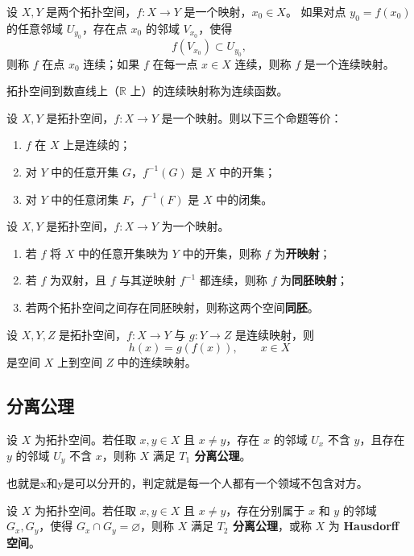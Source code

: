 \begin{definition}[连续映射]
设 $X, Y$ 是两个拓扑空间，$f : X \to Y$ 是一个映射，$x_0 \in X$。  
如果对点 $y_0 = f(x_0)$ 的任意邻域 $U_{y_0}$，存在点 $x_0$ 的邻域 $V_{x_0}$，使得
\[
f(V_{x_0}) \subset U_{y_0},
\]
则称 $f$ 在点 $x_0$ 连续；如果 $f$ 在每一点 $x \in X$ 连续，则称 $f$ 是一个连续映射。  

拓扑空间到数直线上（$\mathbb{R}$ 上）的连续映射称为连续函数。
\end{definition}
\begin{theorem}[连续映射的等价条件]
设 $X, Y$ 是拓扑空间，$f: X \to Y$ 是一个映射。则以下三个命题等价：
\begin{enumerate}
  \item $f$ 在 $X$ 上是连续的；
  \item 对 $Y$ 中的任意开集 $G$，$f^{-1}(G)$ 是 $X$ 中的开集；
  \item 对 $Y$ 中的任意闭集 $F$，$f^{-1}(F)$ 是 $X$ 中的闭集。
\end{enumerate}
\end{theorem}
\begin{proposition}[开映射与同胚]
设 $X, Y$ 是拓扑空间，$f: X \to Y$ 为一个映射。

\begin{enumerate}
  \item 若 $f$ 将 $X$ 中的任意开集映为 $Y$ 中的开集，则称 $f$ 为\textbf{开映射}；
  \item 若 $f$ 为双射，且 $f$ 与其逆映射 $f^{-1}$ 都连续，则称 $f$ 为\textbf{同胚映射}；
  \item 若两个拓扑空间之间存在同胚映射，则称这两个空间\textbf{同胚}。
\end{enumerate}
\end{proposition}


\begin{theorem}[定理 1.5.5]
设 $X,Y,Z$ 是拓扑空间，$f:X \to Y$ 与 $g:Y \to Z$ 是连续映射，则
\[
h(x) = g(f(x)), \qquad x \in X
\]
是空间 $X$ 上到空间 $Z$ 中的连续映射。
\end{theorem}
\subsection{分离公理}
\begin{definition}[$T_1$ 分离公理]
设 $X$ 为拓扑空间。若任取 $x,y\in X$ 且 $x\neq y$，存在 $x$ 的邻域 $U_x$ 不含 $y$，且存在 $y$ 的邻域 $U_y$ 不含 $x$，则称 $X$ 满足 \textbf{$T_1$ 分离公理}。
\end{definition}
也就是x和y是可以分开的，判定就是每一个人都有一个领域不包含对方。
\begin{definition}
设 $X$ 为拓扑空间。若任取 $x,y\in X$ 且 $x\neq y$，存在分别属于 $x$ 和 $y$ 的邻域 $G_x,G_y$，使得 $G_x\cap G_y=\varnothing$，则称 $X$ 满足 \textbf{$T_2$ 分离公理}，或称 $X$ 为 \textbf{Hausdorff 空间}。
\end{definition}

